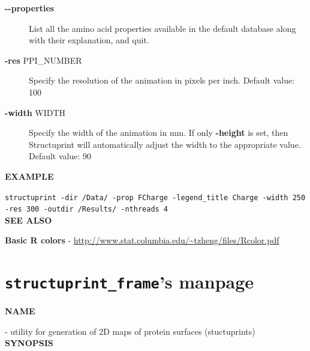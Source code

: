 \documentclass[12pt,a4paper]{article}
\begin{document}
\begin{description}
\item[{\textbf{-{}-properties}}] \mbox{}

List all the amino acid properties available in the default database along with their explanation, and quit.

\item[{\textbf{-res} PPI\_NUMBER}] \mbox{}

Specify the resolution of the animation in pixels per inch. Default value: 100

\item[{\textbf{-width} WIDTH}] \mbox{}

Specify the width of the animation in mm. If only \textbf{-height} is set, then Structuprint will automatically adjust the width to the appropriate value. Default value: 90\\

\end{description}

\textbf{\large{EXAMPLE}}

\texttt{structuprint -dir \textquotesingle /Data/\textquotesingle{} -prop FCharge -legend\_title \textquotesingle Charge\textquotesingle{} -width 250 -res 300 
-outdir \textquotesingle /Results/\textquotesingle{} -nthreads 4}\\

\textbf{\large{SEE ALSO}}
\begin{description}

\item[\textbf{Basic R colors} - \url{http://www.stat.columbia.edu/~tzheng/files/Rcolor.pdf}]
\end{description}

\newpage

\section{\texttt{structuprint\_frame}'s manpage}
\textbf{\large{NAME}}

 - utility for generation of 2D maps of protein surfaces (stuctuprints)\\

\textbf{\large{SYNOPSIS}}
\end{document}
